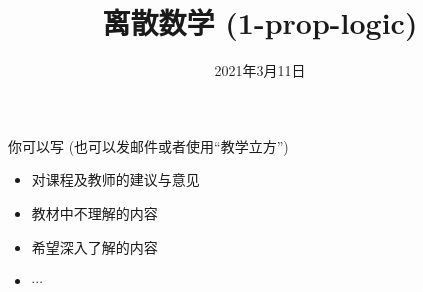 \documentclass[a4paper, justified]{tufte-handout}
\title{离散数学 (1-prop-logic)}
\date{2021年3月11日}
\begin{document}
\maketitle
\noplagiarism %
\begin{abstract}
\end{abstract}
\beginrequired
\begin{problem}[]
\end{problem}

\begin{solution}
\end{solution}

\begin{problem}[]
\end{problem}

\begin{solution}
\end{solution}


\begincorrection

\beginfb

你可以写 (也可以发邮件或者使用``教学立方'')
\begin{itemize}
  \item 对课程及教师的建议与意见
  \item 教材中不理解的内容
  \item 希望深入了解的内容
  \item $\cdots$
\end{itemize}
\end{document}
